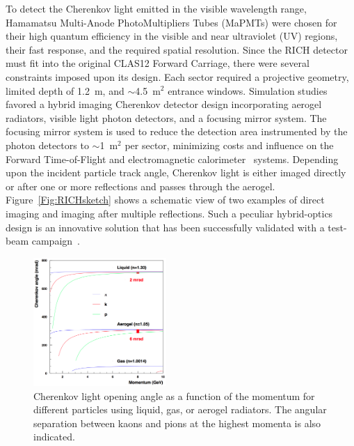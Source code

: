 \documentclass[5p,times,twocolumn]{elsarticle}
\begin{document}
To detect the Cherenkov light emitted in the visible wavelength
range, Hamamatsu Multi-Anode PhotoMultipliers Tubes (MaPMTs) were chosen for their high quantum efficiency in the
visible and near ultraviolet (UV) regions, their fast response, and the required spatial resolution. Since the RICH
detector must fit into the original CLAS12 Forward Carriage, there were several constraints imposed upon its design.
Each sector required a projective geometry, limited depth of 1.2~m, and $\sim$4.5~m$^2$ entrance windows.
Simulation studies favored a hybrid imaging Cherenkov detector design incorporating aerogel radiators, visible light
photon detectors, and a focusing mirror system. The focusing mirror system is used to reduce the detection area
instrumented by the photon detectors to $\sim$1~m$^2$ per sector, minimizing costs and influence on the Forward
Time-of-Flight and electromagnetic calorimeter~\cite{REF:ecal-nim} systems. Depending upon the incident particle track
angle, Cherenkov light is either imaged directly or after one or more reflections and passes through the aerogel.
Figure~\ref{Fig:RICHsketch} shows a schematic view of two examples of direct imaging and imaging after multiple
reflections. Such a peculiar hybrid-optics design is an innovative solution that has been successfully validated with 
a test-beam campaign~\cite{REF:RICH2013}. 

\begin{figure}
\begin{center}
\includegraphics[width=0.45\textwidth]{radiators.png}
\caption{Cherenkov light opening angle as a function of the momentum for different particles using liquid, gas, or
  aerogel radiators. The angular separation between kaons and pions at the highest momenta is also indicated.}
\label{Fig:Radiators}
\end{center}
\end{figure}
\end{document}
